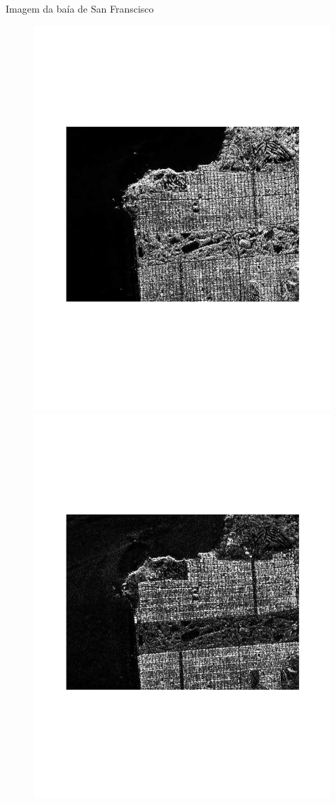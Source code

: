 \documentclass[10pt]{beamer}
\begin{document}
\begin{frame}{Imagem da baía de San Franscisco}
\begin{figure}[hbt]
	\includegraphics[width=\linewidth]{sf_vh.pdf}
\endminipage
{}
	\includegraphics[width=\linewidth]{sf_vv.pdf}

\end{figure}
\end{frame}
\end{document}
